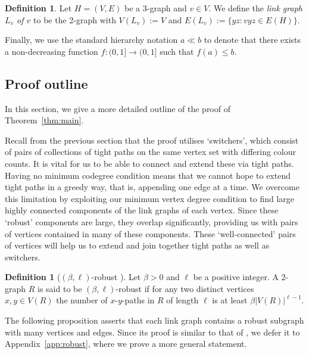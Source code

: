 \documentclass[A4paper,12pt]{article}
\theoremstyle{definition}
\newtheorem{define}[thm]{Definition}
\begin{document}
\begin{define}
    Let $H = (V,E)$ be a 3-graph and $v \in V$. We define the \emph{link graph $L_v$ of $v$} to be the 2-graph with $V(L_v) := V$ and $E(L_v) := \{yz : vyz \in E(H)\}$.
\end{define} 

Finally, we use the standard hierarchy notation $a \ll b$ to denote that there exists a non-decreasing function $f: (0, 1] \to (0,1]$ such that $f(a) \leq b$.

\subsection{Proof outline}\label{sec:proofoutline}

In this section, we give a more detailed outline of the proof of Theorem~\ref{thm:main}.

Recall from the previous section that the proof utilises `switchers', which consist of pairs of collections of tight paths on the same vertex set with differing colour counts. It is vital for us to be able to connect and extend these via tight paths. Having no minimum codegree condition means that we cannot hope to extend tight paths in a greedy way, that is, appending one edge at a time. We overcome this limitation by exploiting our minimum vertex degree condition to find large highly connected components of the link graphs of each vertex. Since these `robust' components are large, they overlap significantly, providing us with pairs of vertices contained in many of these components. These `well-connected' pairs of vertices will help us to extend and join together tight paths as well as switchers. 


\begin{define}[$(\beta,\ell)$-robust {\cite[Definition 2.2]{3hamcycle}}]
       Let $\beta>0$ and $\ell$ be a positive integer. A 2-graph $R$ is said to be $(\beta,\ell)$-robust if for any two distinct vertices $x,y \in V(R)$ the number of $x$-$y$-paths in $R$ of length $\ell$ is at least $\beta|V(R)|^{\ell-1}$.
\end{define}
The following proposition asserts that each link graph contains a robust subgraph with many vertices and edges. Since its proof is similar to that of \cite[Prop 2.3]{3hamcycle}, we defer it to Appendix~\ref{app:robust}, where we prove a more general statement. 
\end{document}
